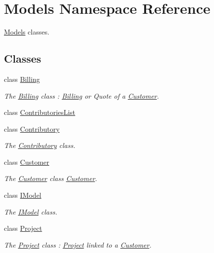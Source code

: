 \hypertarget{namespaceModels}{\section{Models Namespace Reference}
\label{namespaceModels}
}


\hyperlink{namespaceModels}{Models} classes.  


\subsection*{Classes}
\begin{DoxyCompactItemize}
\item 
class \hyperlink{classModels_1_1Billing}{Billing}
\begin{DoxyCompactList}\small\item\em The \hyperlink{classModels_1_1Billing}{Billing} class \-: \hyperlink{classModels_1_1Billing}{Billing} or Quote of a \hyperlink{classModels_1_1Customer}{Customer}. \end{DoxyCompactList}\item 
class \hyperlink{classModels_1_1ContributoriesList}{Contributories\-List}
\item 
class \hyperlink{classModels_1_1Contributory}{Contributory}
\begin{DoxyCompactList}\small\item\em The \hyperlink{classModels_1_1Contributory}{Contributory} class. \end{DoxyCompactList}\item 
class \hyperlink{classModels_1_1Customer}{Customer}
\begin{DoxyCompactList}\small\item\em The \hyperlink{classModels_1_1Customer}{Customer} class \hyperlink{classModels_1_1Customer}{Customer}. \end{DoxyCompactList}\item 
class \hyperlink{classModels_1_1IModel}{I\-Model}
\begin{DoxyCompactList}\small\item\em The \hyperlink{classModels_1_1IModel}{I\-Model} class. \end{DoxyCompactList}\item 
class \hyperlink{classModels_1_1Project}{Project}
\begin{DoxyCompactList}\small\item\em The \hyperlink{classModels_1_1Project}{Project} class \-: \hyperlink{classModels_1_1Project}{Project} linked to a \hyperlink{classModels_1_1Customer}{Customer}. \end{DoxyCompactList}\item 

\end{DoxyCompactItemize}
